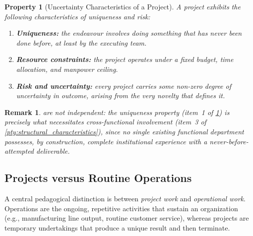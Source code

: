 \documentclass[12pt, a4paper]{report}
\theoremstyle{engnotes}
\newtheorem{property}{Property}[section]
\newtheorem{remark}{Remark}[section]
\begin{document}
\begin{property}[Uncertainty Characteristics of a Project]\label{pty:uncertainty_characteristics}
    A project exhibits the following characteristics of uniqueness and risk:
    \begin{enumerate}
        \item \textbf{Uniqueness:} the endeavour involves doing something that has never been done before, at least by the executing team.
        \item \textbf{Resource constraints:} the project operates under a fixed budget, time allocation, and manpower ceiling.
        \item \textbf{Risk and uncertainty:} every project carries some non-zero degree of uncertainty in outcome, arising from the very novelty that defines it.
    \end{enumerate}
\end{property}

\begin{remark}
     are not independent: the uniqueness property (item~1 of \cref{pty:uncertainty_characteristics}) is precisely what necessitates cross-functional involvement (item~3 of \cref{pty:structural_characteristics}), since no single existing functional department possesses, by construction, complete institutional experience with a never-before-attempted deliverable.
\end{remark}

\subsection{Projects versus Routine Operations}
\label{subsec:project_vs_operations}

A central pedagogical distinction is between \emph{project work} and \emph{operational work}. Operations are the ongoing, repetitive activities that sustain an organization (e.g., manufacturing line output, routine customer service), whereas projects are temporary undertakings that produce a unique result and then terminate.
\end{document}
